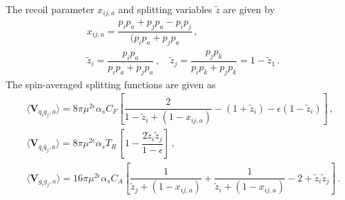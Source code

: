\documentclass[main.tex]{subfiles}
\begin{document}
        The recoil parameter $x_{ij,a}$ and splitting variables $\tilde{z}$ are given by
        \begin{align}\label{eqn:x_ija}
            &x_{ij,a} = \dfrac{p_{i}p_{a} + p_{j}p_{a} - p_{i}p_{j}}{(p_{i}p_{a} + p_{j}p_{a}} \, , \\
            &\tilde{z}_{i} = \dfrac{p_{i}p_{a}}{p_{i}p_{a} + p_{j}p_{a}} \, , \quad \tilde{z}_{j} = \dfrac{p_{j}p_{k}}{p_{i}p_{k} + p_{j}p_{k}} = 1 - \tilde{z}_{1} \, .
        \end{align}
        The spin-averaged splitting functions are given as
        \begin{align}\label{eqn:FI_V_aij}
            &\langle \boldsymbol{V}_{q_{i}g_{j},a} \rangle = 8\pi \mu^{2\epsilon}\alpha_{s} C_{F} \left[\dfrac{2}{1 - \tilde{z}_{i} + (1-x_{ij,a})} - (1+\tilde{z}_{i}) - \epsilon(1-\tilde{z}_{i})\right] \, , \nonumber \\
            &\langle \boldsymbol{V}_{q_{i}\bar{q}_{j},a} \rangle = 8\pi \mu^{2\epsilon}\alpha_{s} T_{R} \, \left[1-\dfrac{2\tilde{z}_{i}\tilde{z}_{j}}{1-\epsilon}\right] \, , \nonumber \\
            &\langle \boldsymbol{V}_{g_{i}g_{j},a} \rangle = 16\pi \mu^{2\epsilon} \alpha_{s} C_{A} \left[\dfrac{1}{\tilde{z}_{j} + (1-x_{ij,a})} + \dfrac{1}{\tilde{z}_{i} + (1-x_{ij,a})} - 2 + \tilde{z}_{i}\tilde{z}_{j}\right] \, .
        \end{align}
\end{document}
